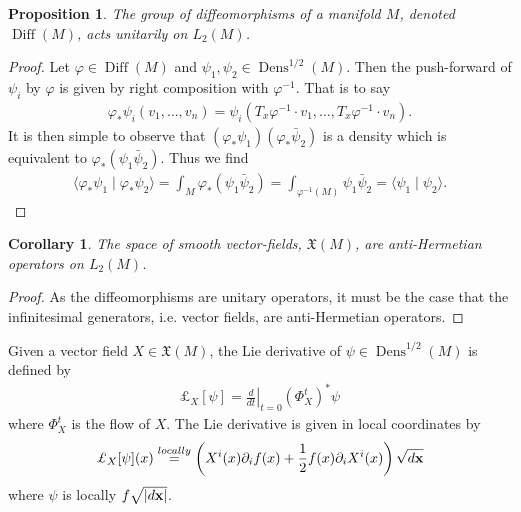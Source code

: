 \documentclass[12pt]{amsart}
\newtheorem{prop}{Proposition}
\newtheorem{cor}{Corollary}
\DeclareMathOperator{\Diff}{Diff}
\DeclareMathOperator{\Dens}{Dens}
\begin{document}
\begin{prop}
  The group of diffeomorphisms of a manifold $M$, denoted $\Diff(M)$, acts
  unitarily on $L_2(M)$.
\end{prop}

\begin{proof}
  Let $\varphi \in \Diff(M)$ and $\psi_1,\psi_2 \in \Dens^{1/2}(M)$.
  Then the push-forward of $\psi_i$ by $\varphi$ is given by right composition with $\varphi^{-1}$.
  That is to say
  \begin{align*}
    \varphi_* \psi_i( v_1, \dots, v_n ) = \psi_i( T_x\varphi^{-1} \cdot v_1,\dots,T_x\varphi^{-1} \cdot v_n ).
  \end{align*}
  It is then simple to observe that $(\varphi_* \psi_1 ) (\varphi_* \bar{\psi}_2)$ is a density which is equivalent to $\varphi_*( \psi_1 \bar{\psi}_2)$.
  Thus we find
  \begin{align*}
    \langle \varphi_* \psi_1 \mid \varphi_* \psi_2 \rangle = \int_M \varphi_*( \psi_1 \bar{\psi}_2) = \int_{\varphi^{-1}(M)} \psi_1 \bar{\psi}_2 = \langle \psi_1 \mid \psi_2 \rangle.
  \end{align*}
\end{proof}

\begin{cor}
  The space of smooth vector-fields, $\mathfrak{X}(M)$, are anti-Hermetian operators on $L_2(M)$.
\end{cor}
\begin{proof}
  As the diffeomorphisms are unitary operators, it must be the case that the infinitesimal generators, i.e. vector fields, are anti-Hermetian operators.
\end{proof}

Given a vector field $X \in \mathfrak{X}(M)$, the Lie derivative of $\psi \in \Dens^{1/2}(M)$ is defined by
\begin{align*}
  \pounds_X[ \psi] = \left. \frac{d}{dt} \right|_{t=0} (\Phi_X^t)^* \psi
\end{align*}
where $\Phi_X^t$ is the flow of $X$.
The Lie derivative is given in local coordinates by
\begin{align*}
  \pounds_X[\psi](x) \stackrel{locally}{=} \left( X^i(x) \partial_i f(x) + \frac{1}{2} f(x) \partial_iX^i(x) \right) \sqrt{d {\bf x} }
\end{align*}
where $\psi$ is locally $f \sqrt{ |d {\bf x}| }$.
\end{document}
